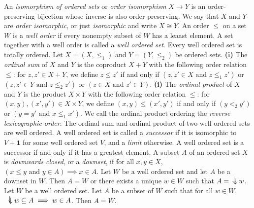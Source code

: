  An \textit{isomorphism of ordered sets} or \textit{order isomorphism} $X \to Y$ is an order-preserving bijection whose inverse is also order-preserving. We say that $X$ and $Y$ are \textit{order isomorphic}, or just \textit{isomorphic} and write $X \cong Y$.
 An order $\leq$ on a set $W$ is a \textit{well order} if every nonempty subset of $W$ has a leaast element. A set together with a well order is called a \textit{well ordered set}.
 Every well ordered set is totally ordered.
 Let $X = (X, \leq_1)$ and $Y = (Y, \leq_2)$ be ordered sets. \textbf{(i)} The \textit{ordinal sum} of $X$ and $Y$ is the coproduct $X + Y$ with the following order relation $\leq$: for $z, z' \in X + Y$, we define $z \leq z'$ if and only if $(z, z' \in X \text{ and } z \leq_1 z')$ or $(z, z' \in Y \text{ and } z \leq_2 z')$ or $(z \in X \text{ and } z' \in Y)$. \textbf{(i)} The \textit{ordinal product} of $X$ and $Y$ is the product $X \times Y$ with the following order relation $\leq$: for $(x, y), (x', y') \in X \times Y$, we define $(x, y) \leq (x', y')$ if and only if $(y <_2 y')$ or $(y = y' \text{ and } x \leq_1 x')$. We call the ordinal product ordering the \textit{reverse lexicographic order}.
 The ordinal sum and ordinal product of two well ordered sets are well ordered.
 A well ordered set is called a \textit{successor} if it is isomorphic to $V + \mathbf{1}$ for some well ordered set $V$, and a \textit{limit} otherwise.
 A well ordered set is a successor if and only if it has a greatest element.
 A subset $A$ of an ordered set $X$ is \textit{downwards closed}, or a \textit{downset}, if for all $x, y \in X$, $(x \leq y \text{ and } y \in A) \implies x \in A$.
 Let $W$ be a well ordered set and let $A$ be a downset in $W$. Then $A = W$ or there exists a unique $w \in W$ such that $A = \ddownarrow w$.
 Let $W$ be a well ordered set. Let $A$ be a subset of $W$ such that for all $w \in W$, $\ddownarrow w \subseteq A \implies w \in A$. Then $A = W$.
